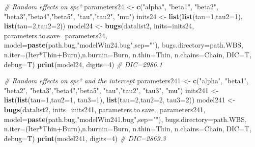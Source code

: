 \documentclass[]{article}
\newenvironment{Shaded}{\begin{snugshade}}{\end{snugshade}}
\newcommand{\KeywordTok}[1]{\textcolor[rgb]{0.13,0.29,0.53}{\textbf{{#1}}}}
\newcommand{\DataTypeTok}[1]{\textcolor[rgb]{0.13,0.29,0.53}{{#1}}}
\newcommand{\DecValTok}[1]{\textcolor[rgb]{0.00,0.00,0.81}{{#1}}}
\newcommand{\StringTok}[1]{\textcolor[rgb]{0.31,0.60,0.02}{{#1}}}
\newcommand{\CommentTok}[1]{\textcolor[rgb]{0.56,0.35,0.01}{\textit{{#1}}}}
\newcommand{\NormalTok}[1]{{#1}}
\begin{document}
\begin{Shaded}
\begin{Highlighting}[]
{{\CommentTok{# Random effects on spc²}
\NormalTok{parameters24 <-}\StringTok{ }\KeywordTok{c}\NormalTok{(}\StringTok{"alpha"}\NormalTok{, }\StringTok{"beta1"}\NormalTok{, }\StringTok{"beta2"}\NormalTok{, }\StringTok{"beta3"}\NormalTok{,}\StringTok{"beta4"}\NormalTok{,}\StringTok{"beta5"}\NormalTok{, }\StringTok{"tau"}\NormalTok{,}\StringTok{"tau2"}\NormalTok{, }\StringTok{"mu"}\NormalTok{)}
\NormalTok{inits24 <-}\StringTok{ }\KeywordTok{list}\NormalTok{(}\KeywordTok{list}\NormalTok{(}\DataTypeTok{tau=}\DecValTok{1}\NormalTok{,}\DataTypeTok{tau2=}\DecValTok{1}\NormalTok{), }\KeywordTok{list}\NormalTok{(}\DataTypeTok{tau=}\DecValTok{2}\NormalTok{,}\DataTypeTok{tau2=}\DecValTok{2}\NormalTok{))}
\NormalTok{model24 <-}\StringTok{ }\KeywordTok{bugs}\NormalTok{(datalist2, }\DataTypeTok{inits=}\NormalTok{inits24, }\DataTypeTok{parameters.to.save=}\NormalTok{parameters24,}
               \DataTypeTok{model=}\KeywordTok{paste}\NormalTok{(path.bug,}\StringTok{"modelWin24.bug"}\NormalTok{,}\DataTypeTok{sep=}\StringTok{""}\NormalTok{),}
               \DataTypeTok{bugs.directory=}\NormalTok{path.WBS,               }
               \DataTypeTok{n.iter=}\NormalTok{(Iter*Thin+Burn),}\DataTypeTok{n.burnin=}\NormalTok{Burn, }\DataTypeTok{n.thin=}\NormalTok{Thin, }\DataTypeTok{n.chains=}\NormalTok{Chain, }\DataTypeTok{DIC=}\NormalTok{T, }\DataTypeTok{debug=}\NormalTok{T)}
\KeywordTok{print}\NormalTok{(model24, }\DataTypeTok{digits=}\DecValTok{4}\NormalTok{)}
\CommentTok{# DIC=2986.1}

\CommentTok{# Random effects on spc² and the intercept}
\NormalTok{parameters241 <-}\StringTok{ }\KeywordTok{c}\NormalTok{(}\StringTok{"alpha"}\NormalTok{, }\StringTok{"beta1"}\NormalTok{, }\StringTok{"beta2"}\NormalTok{, }\StringTok{"beta3"}\NormalTok{,}\StringTok{"beta4"}\NormalTok{,}\StringTok{"beta5"}\NormalTok{, }\StringTok{"tau"}\NormalTok{,}\StringTok{"tau2"}\NormalTok{, }\StringTok{"tau3"}\NormalTok{, }\StringTok{"mu"}\NormalTok{)}
\NormalTok{inits241 <-}\StringTok{ }\KeywordTok{list}\NormalTok{(}\KeywordTok{list}\NormalTok{(}\DataTypeTok{tau=}\DecValTok{1}\NormalTok{,}\DataTypeTok{tau2=}\DecValTok{1}\NormalTok{, }\DataTypeTok{tau3=}\DecValTok{1}\NormalTok{), }\KeywordTok{list}\NormalTok{(}\DataTypeTok{tau=}\DecValTok{2}\NormalTok{,}\DataTypeTok{tau2=}\DecValTok{2}\NormalTok{, }\DataTypeTok{tau3=}\DecValTok{2}\NormalTok{))}
\NormalTok{model241 <-}\StringTok{ }\KeywordTok{bugs}\NormalTok{(datalist2, }\DataTypeTok{inits=}\NormalTok{inits241, }\DataTypeTok{parameters.to.save=}\NormalTok{parameters241,}
                 \DataTypeTok{model=}\KeywordTok{paste}\NormalTok{(path.bug,}\StringTok{"modelWin241.bug"}\NormalTok{,}\DataTypeTok{sep=}\StringTok{""}\NormalTok{),}
                 \DataTypeTok{bugs.directory=}\NormalTok{path.WBS,               }
                 \DataTypeTok{n.iter=}\NormalTok{(Iter*Thin+Burn),}\DataTypeTok{n.burnin=}\NormalTok{Burn, }\DataTypeTok{n.thin=}\NormalTok{Thin, }\DataTypeTok{n.chains=}\NormalTok{Chain, }\DataTypeTok{DIC=}\NormalTok{T, }\DataTypeTok{debug=}\NormalTok{T)}
\KeywordTok{print}\NormalTok{(model241, }\DataTypeTok{digits=}\DecValTok{4}\NormalTok{) }
\CommentTok{# DIC=2869.3}

}}
\end{Highlighting}
\end{Shaded}
\end{document}
